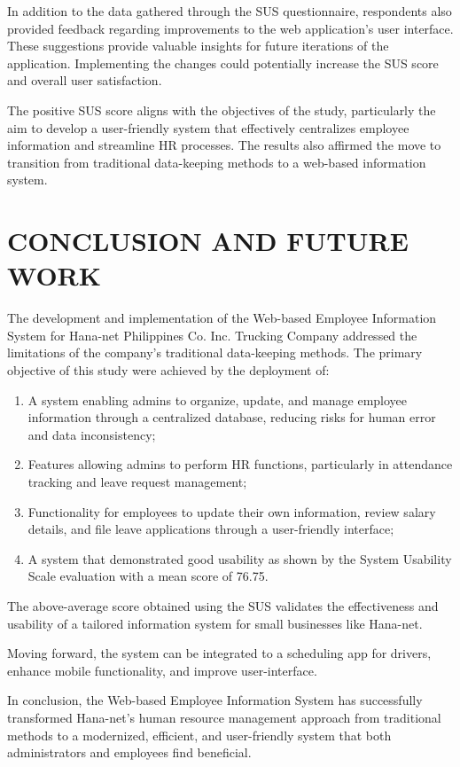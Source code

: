 \documentclass[journal]{./IEEE/IEEEtran}
\begin{document}
In addition to the data gathered through the SUS questionnaire, respondents also provided feedback regarding improvements to the web application's user interface. These suggestions provide valuable insights for future iterations of the application. Implementing the changes could potentially increase the SUS score and overall user satisfaction.

The positive SUS score aligns with the objectives of the study, particularly the aim to develop a user-friendly system that effectively centralizes employee information and streamline HR processes. The results also affirmed the move to transition from traditional data-keeping methods to a web-based information system.

\section{\textbf{CONCLUSION AND FUTURE WORK}}
The development and implementation of the Web-based Employee Information System for Hana-net Philippines Co. Inc. Trucking Company addressed the limitations of the company's traditional data-keeping methods. The primary objective of this study were achieved by the deployment of: 
\begin{enumerate}
    \item A system enabling admins to organize, update, and manage employee information through a centralized database, reducing risks for human error and data inconsistency;
    \item Features allowing admins to perform HR functions, particularly in attendance tracking and leave request management;
    \item Functionality for employees to update their own information, review salary details, and file leave applications through a user-friendly interface;
    \item A system that demonstrated good usability as shown by the System Usability Scale evaluation with a mean score of 76.75.
\end{enumerate}

The above-average score obtained using the SUS validates the effectiveness and usability of a tailored information system for small businesses like Hana-net.

Moving forward, the system can be integrated to a scheduling app for drivers, enhance mobile functionality, and improve user-interface. 

In conclusion, the Web-based Employee Information System has successfully transformed Hana-net's human resource management approach from traditional methods to a modernized, efficient, and user-friendly system that both administrators and employees find beneficial.
\end{document}
